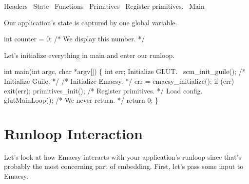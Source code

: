 \nwenddocs{}\endmoddef\nwstartdeflinemarkup\nwenddeflinemarkup
\LA{}Headers~{\nwtagstyle{}}\RA{}
\LA{}State~{\nwtagstyle{}}\RA{}
\LA{}Functions~{\nwtagstyle{}}\RA{}
\LA{}Primitives~{\nwtagstyle{}}\RA{}
\LA{}Register primitives.~{\nwtagstyle{}}\RA{}
\LA{}Main~{\nwtagstyle{}}\RA{}
\nwendcode{}\nwdocspar

Our application's state is captured by one global variable.

\nwenddocs{}\endmoddef\nwstartdeflinemarkup{}\nwenddeflinemarkup
int counter = 0; /* We display this number. */
\nwendcode{}\nwdocspar

Let's initialize everything in {\Tt{}main\nwendquote} and enter our runloop.

\nwenddocs{}\endmoddef\nwstartdeflinemarkup{}\nwenddeflinemarkup
int main(int argc, char *argv[]) \{
  int err;
  \LA{}Initialize GLUT.~{\nwtagstyle{}}\RA{}
  scm_init_guile();    /* Initialize Guile. */
  /* Initialize Emacsy. */
  err = emacsy_initialize(); 
  if (err)
    exit(err);
  primitives_init();   /* Register primitives. */
  \LA{}Load config.~{\nwtagstyle{}}\RA{}
  glutMainLoop();      /* We never return. */
  return 0; 
\}
\nwendcode{}\nwdocspar


\section{Runloop Interaction}

Let's look at how Emacsy interacts with your application's runloop
since that's probably the most concerning part of embedding.  First,
let's pass some input to Emacsy.

